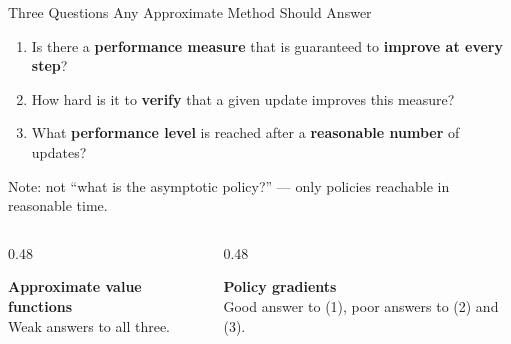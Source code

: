 \documentclass[aspectratio=169]{beamer}
\begin{document}
\begin{frame}{Three Questions Any Approximate Method Should Answer}
  \begin{enumerate}
    \item Is there a \textbf{performance measure} that is guaranteed to \textbf{improve at every step}?
    \item How hard is it to \textbf{verify} that a given update improves this measure?
    \item What \textbf{performance level} is reached after a \textbf{reasonable number} of updates?
  \end{enumerate}

  \vspace{10pt}
  \begin{noteframe}
    \small Note: not ``what is the asymptotic policy?'' --- only policies reachable in reasonable time.
  \end{noteframe}

  \vspace{6pt}
  \begin{columns}[t]
    \begin{column}{0.48\textwidth}
      \begin{warmbox}
        \small\textbf{\color{AtlasWarm}Approximate value functions}\\
        Weak answers to all three.
      \end{warmbox}
    \end{column}
    \begin{column}{0.48\textwidth}
      \begin{coolbox}
        \small\textbf{\color{AtlasCool}Policy gradients}\\
        Good answer to (1), poor answers to (2) and (3).
      \end{coolbox}
    \end{column}
  \end{columns}
\end{frame}
\end{document}
